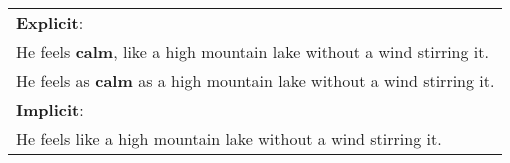 
\begingroup
\vspace{2ex}
\renewcommand*{\tabcolsep}{2pt}
{\scriptsize
\hspace{-10pt}
\begin{tabular}{|l|}
\hline
\textbf{Explicit}:\\
He feels \textbf{calm}, like a high mountain lake without a wind stirring it. \\ 
He feels as \textbf{calm} as a high mountain lake without a wind stirring it.\\ \hline
\textbf{Implicit}:\\
He feels like a high mountain lake without a wind stirring it. \\ \hline
\end{tabular}
}
\vspace{2ex}
\endgroup